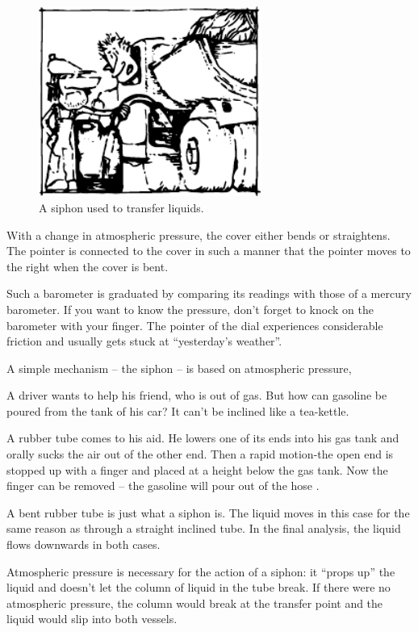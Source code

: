 \begin{figure}[!ht]
\centering
\includegraphics[width=0.65\textwidth]{figures/fig-7-5.pdf}
\caption{A siphon used to transfer liquids.}
\label{fig-7-5}
\end{figure}

With a change in atmospheric pressure, the cover either
bends or straightens. The pointer is connected to the cover
in such a manner that the pointer moves to the right
when the cover is bent.

Such a barometer is graduated by comparing its readings with those of a mercury barometer. If you want to know the pressure, don't forget to knock on the barometer with your finger. The pointer of the dial experiences considerable friction and usually gets stuck at ``yesterday's weather''.

A simple mechanism -- the siphon -- is based on atmospheric pressure,

A driver wants to help his friend, who is out of gas. But how can gasoline be poured from the tank of his car? It can't be inclined like a tea-kettle.

A rubber tube comes to his aid. He lowers one of its ends into his gas tank and orally sucks the air out of the other end. Then a rapid motion-the open end is stopped up with a finger and placed at a height below the gas tank. Now the finger can be removed -- the gasoline will pour out of the hose .

A bent rubber tube is just what a siphon is. The liquid moves in this case for the same reason as through a straight inclined tube. In the final analysis, the liquid flows downwards in both cases.

Atmospheric pressure is necessary for the action of
a siphon: it ``props up'' the liquid and doesn't let the
column of liquid in the tube break. If there were no
atmospheric pressure, the column would break at the
transfer point and the liquid would slip into both vessels.

